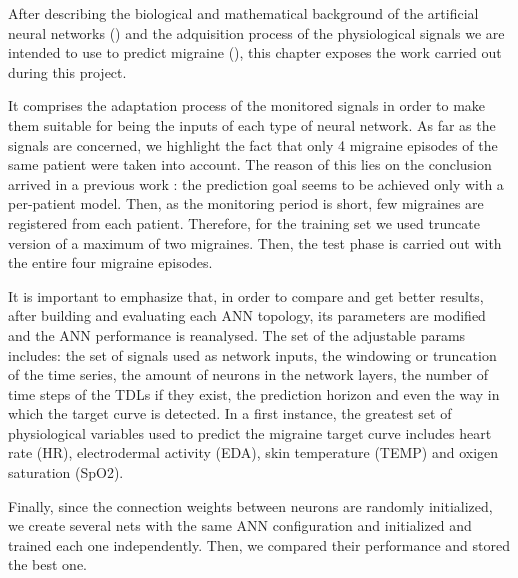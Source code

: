 \label{chapter:application}

After describing the biological and mathematical background of the
artificial neural networks () and the adquisition process
of the physiological signals we are intended to use to predict
migraine (), this chapter exposes the work carried out
during this project.


It comprises the adaptation process of the monitored signals in order
to make them suitable for being the inputs of each type of neural
network.  As far as the signals are concerned, we highlight the fact
that only 4 migraine episodes of the same patient were taken into
account.  The reason of this lies on the conclusion arrived in a
previous work \cite{Irene:PFC:2014}: the prediction goal seems to be
achieved only with a per-patient model.  Then, as the monitoring period
is short, few migraines are registered from each patient.  Therefore,
for the training set we used truncate version of a maximum of two
migraines. Then, the test phase is carried out with the entire four
migraine episodes.


It is important to emphasize that, in order to compare and get better
results, after building and evaluating each ANN topology, its
parameters are modified and the ANN performance is reanalysed.  The
set of the adjustable params includes: the set of signals used as
network inputs, the windowing or truncation of the time series, the
amount of neurons in the network layers, the number of time steps of
the TDLs if they exist, the prediction horizon and even the way in
which the target curve is detected.  In a first instance, the greatest
set of physiological variables used to predict the migraine target
curve includes heart rate (HR), electrodermal activity (EDA), skin
temperature (TEMP) and oxigen saturation (SpO2).

Finally, since the connection weights between neurons are randomly initialized,
we create several nets with the same ANN configuration and initialized
and trained each one independently. 
Then, we compared their performance and stored the best one.

